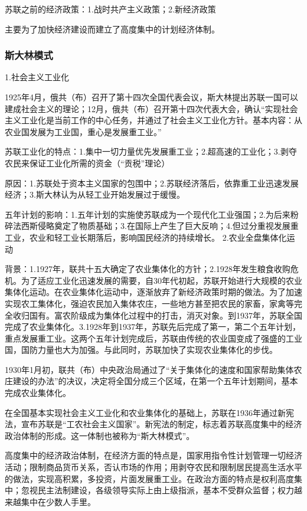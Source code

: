 苏联之前的经济政策：1.战时共产主义政策；2.新经济政策

主要为了加快经济建设而建立了高度集中的计划经济体制。

\subsubsection{斯大林模式}
1.社会主义工业化

1925年4月，俄共（布）召开了第十四次全国代表会议，斯大林提出苏联一国可以建成社会主义的理论；12月，俄共（布）召开第十四次代表大会，确认“实现社会主义工业化是当前工作的中心任务，并通过了社会主义工业化方针。基本内容：从农业国发展为工业国，重心是发展重工业。”

苏联工业化的特点：1.集中一切力量优先发展重工业；2.超高速的工业化；3.剥夺农民来保证工业化所需的资金（“贡税”理论）

原因：1.苏联处于资本主义国家的包围中；2.苏联经济落后，依靠重工业迅速发展经济；3.斯大林认为从轻工业开始发展过于缓慢。

五年计划的影响：1.五年计划的实施使苏联成为一个现代化工业强国；2.为后来粉碎法西斯侵略奠定了物质基础；3.在国际上产生了巨大反响；4.但过分重视发展重工业，农业和轻工业长期落后，影响国民经济的持续增长。
2.农业全盘集体化运动

背景：1.1927年，联共十五大确定了农业集体化的方针；2.1928年发生粮食收购危机。为了适应工业化迅速发展的需要，自30年代初起，苏联开始进行大规模的农业集体化运动。在农业集体化运动中，逐渐放弃了新经济政策时期的做法。为了加速实现农工集体化，强迫农民加入集体农庄，一些地方甚至把农民的家畜，家禽等完全收归国有。富农阶级成为集体化过程中的打击，消灭对象。到1937年，苏联全国完成了农业集体化。3.1928年到1937年，苏联先后完成了第一，第二个五年计划，重点发展重工业。这两个五年计划完成后，苏联由传统的农业国变成了强盛的工业国，国防力量也大为加强。与此同时，苏联加快了实现农业集体化的步伐。

1930年1月初，联共（布）中央政治局通过了“关于集体化的速度和国家帮助集体农庄建设的办法”的决议，决定将全国分成三个区域，在第一个五年计划期间，基本完成农业集体化。

在全国基本实现社会主义工业化和农业集体化的基础上，苏联在1936年通过新宪法，宣布苏联是“工农社会主义国家”。新宪法的制定，标志着苏联高度集中的经济政治体制的形成。这一体制也被称为“斯大林模式”。

高度集中的经济政治体制，在经济方面的特点是，国家用指令性计划管理一切经济活动；限制商品货币关系，否认市场的作用；用剥夺农民和限制居民提高生活水平的做法，实现高积累，多投资，片面发展重工业。在政治方面的特点是权利高度集中；忽视民主法制建设，各级领导实际上由上级指派，基本不受群众监督；权力越来越集中在少数人手里。


